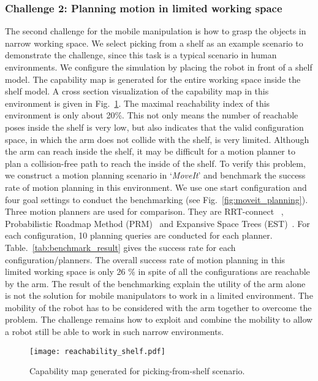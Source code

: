\subsubsection{Challenge 2: Planning motion in limited working space} 

The second challenge for the mobile manipulation is how to grasp the objects in narrow working space. We select picking from a shelf as an example scenario to demonstrate the challenge, since this task is a typical scenario in human environments. We configure the simulation by placing the robot in front of a shelf model. The capability map is generated for the entire working space inside the shelf model. A cross section visualization of the capability map in this environment is given in Fig.~\ref{fig:cmap_shelf}. The maximal reachability index of this environment is only about 20\%. This not only means the number of reachable poses inside the shelf is very low, but also indicates that the valid configuration space, in which the arm does not collide with the shelf,  is very limited. Although the arm can reach inside the shelf, it may be difficult for a motion planner to plan a collision-free path to reach the inside of the shelf. To verify this problem, we construct a motion planning scenario in `\textit{MoveIt}' \cite{sucan2013moveit} and benchmark the success rate of motion planning in this environment. We use one start configuration and four goal settings to conduct the benchmarking (see Fig.~\ref{fig:moveit_planning}). Three motion planners are used for comparison. They are RRT-connect~ \cite{kuffner2000rrt}, Probabilistic Roadmap Method (PRM)~\cite{kavraki1996probabilistic} and Expansive Space Trees (EST)~\cite{phillips2004guided}. For each configuration, 10 planning queries are conducted for each planner. Table.~\ref{tab:benchmark_result} gives the success rate for each configuration/planners. The overall success rate of motion planning in this limited working space is only 26 \% in spite of all the configurations are reachable by the arm. The result of the benchmarking explain the utility of the arm alone is not the solution  for mobile manipulators to work in a limited environment. The mobility of the robot has to be considered with the arm together to overcome the problem. The challenge remains how to exploit and combine the mobility to allow a robot still be able to  work in such narrow environments. 

\begin{figure}[!htbp]
\centering
\texttt{[image: reachability\_shelf.pdf]}
\captionsetup{justification=raggedright}
\caption{Capability map generated for picking-from-shelf scenario. }
\label{fig:cmap_shelf}       %
\end{figure} 

